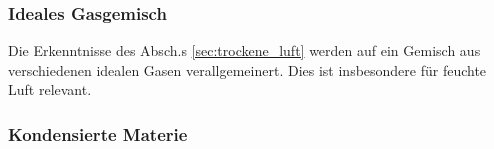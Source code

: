 \documentclass{book}
\begin{document}
\subsubsection{Ideales Gasgemisch}
\label{sec:ideales_gasgemisch}

Die Erkenntnisse des Absch.s \ref{sec:trockene_luft} werden auf ein Gemisch aus verschiedenen idealen Gasen verallgemeinert. Dies ist insbesondere für feuchte Luft relevant.

\subsubsection{Kondensierte Materie}
\label{sec:kondensierte_materie}
\end{document}
